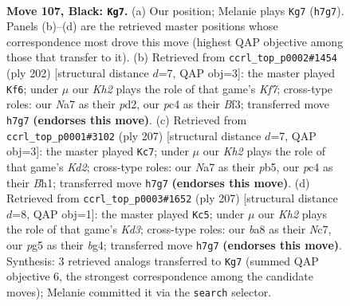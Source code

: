 \documentclass[11pt]{article}
\begin{document}
\clearpage

\begin{figure}[p]\centering
\begin{subfigure}{0.46\textwidth}\centering
\resizebox{\linewidth}{!}{%
\newchessgame
\chessboard[
  setfen={B7/n6k/8/6PK/2P5/7P/8/8 b - - 0 107},
  showmover=false,
  pgfstyle=straightmove, color=movearrow, markmove={h7-g7}
]}
\caption{}
\end{subfigure}\hfill
\begin{subfigure}{0.46\textwidth}\centering
\resizebox{\linewidth}{!}{%
\newchessgame
\chessboard[
  setfen={8/5K2/1b5k/6p1/8/5B2/3p4/8 w - - 76 102},
  showmover=false,
  pgfstyle=straightmove, color=movearrow, markmove={f7-f6}
]}
\caption{}
\end{subfigure}
\\[4pt]
\begin{subfigure}{0.46\textwidth}\centering
\resizebox{\linewidth}{!}{%
\newchessgame
\chessboard[
  setfen={8/3k4/8/1PP5/3K4/8/8/4B2b b - - 84 104},
  showmover=false,
  pgfstyle=straightmove, color=movearrow, markmove={d7-c7}
]}
\caption{}
\end{subfigure}\hfill
\begin{subfigure}{0.46\textwidth}\centering
\resizebox{\linewidth}{!}{%
\newchessgame
\chessboard[
  setfen={8/2n5/3k4/p7/6B1/2P5/P1K5/8 b - - 82 104},
  showmover=false,
  pgfstyle=straightmove, color=movearrow, markmove={d6-c5}
]}
\caption{}
\end{subfigure}
\caption{\textbf{Move 107, Black: \texttt{Kg7}.} (a) Our position; Melanie plays \texttt{Kg7} (\texttt{h7g7}). Panels (b)--(d) are the retrieved master positions whose correspondence most drove this move (highest QAP objective among those that transfer to it). (b) Retrieved from \texttt{ccrl\_top\_p0002\#1454} (ply 202) [structural distance $d$=7, QAP obj=3]: the master played \texttt{Kf6}; under $\mu$ our \emph{Kh2} plays the role of that game's \emph{Kf7}; cross-type roles: our \emph{N}a7 as their \emph{p}d2, our \emph{p}c4 as their \emph{B}f3; transferred move \texttt{h7g7} \textbf{(endorses this move)}. (c) Retrieved from \texttt{ccrl\_top\_p0001\#3102} (ply 207) [structural distance $d$=7, QAP obj=3]: the master played \texttt{Kc7}; under $\mu$ our \emph{Kh2} plays the role of that game's \emph{Kd2}; cross-type roles: our \emph{N}a7 as their \emph{p}b5, our \emph{p}c4 as their \emph{B}h1; transferred move \texttt{h7g7} \textbf{(endorses this move)}. (d) Retrieved from \texttt{ccrl\_top\_p0003\#1652} (ply 207) [structural distance $d$=8, QAP obj=1]: the master played \texttt{Kc5}; under $\mu$ our \emph{Kh2} plays the role of that game's \emph{Kd3}; cross-type roles: our \emph{b}a8 as their \emph{N}c7, our \emph{p}g5 as their \emph{b}g4; transferred move \texttt{h7g7} \textbf{(endorses this move)}. Synthesis: 3 retrieved analogs transferred to \texttt{Kg7} (summed QAP objective 6, the strongest correspondence among the candidate moves); Melanie committed it via the \texttt{search} selector.}
\label{fig:thought-m213}
\end{figure}
\end{document}
